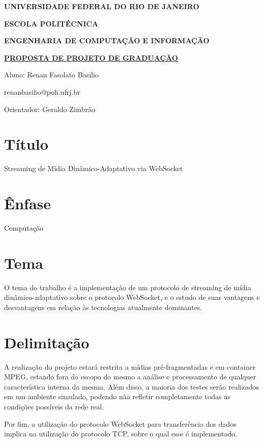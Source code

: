 \documentclass[a4paper,12pt]{article}
\begin{document}
\begin{center}
\textbf{UNIVERSIDADE FEDERAL DO RIO DE JANEIRO}
\vspace{-0.2cm}

\textbf{ESCOLA POLITÉCNICA}
\vspace{-0.2cm}

\textbf{ENGENHARIA DE COMPUTAÇÃO E INFORMAÇÃO}
\vspace{0.8cm}

\underline{\textbf{PROPOSTA DE PROJETO DE GRADUAÇÃO}}

Aluno: Renan Fasolato Basilio
\vspace{-0.2cm}

renanbasilio@poli.ufrj.br

Orientador: Geraldo Zimbrão
\end{center}

\section{Título}

Streaming de Mídia Dinâmico-Adaptativo via WebSocket

\section{Ênfase}

Computação

\section{Tema}

O tema do trabalho é a implementação de um protocolo de streaming de mídia dinâmico-adaptativo sobre o protocolo WebSocket, e o estudo de suas vantagens e desvantagens em relação às tecnologias atualmente dominantes.

\section{Delimitação}

A realização do projeto estará restrita a mídias pré-fragmentadas e em container MPEG, estando fora do escopo do mesmo a análise e processamento de qualquer característica interna da mesma. Além disso, a maioria dos testes serão realizados em um ambiente simulado, podendo não refletir completamente todas as condições possíveis da rede real.

Por fim, a utilização do protocolo WebSocket para transferência dos dados implica na utilização 
do protocolo TCP, sobre o qual esse é implementado.
\end{document}

